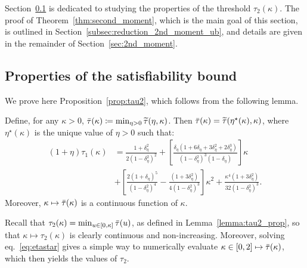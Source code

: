 Section~\ref{subsec:proof_properties_tau2} is dedicated to studying the properties of the threshold $\tau_2(\kappa)$. 
The proof of Theorem~\ref{thm:second_moment}, which is the main goal of this section, is outlined in Section~\ref{subsec:reduction_2nd_moment_ub},
and details are given in the remainder of Section~\ref{sec:2nd_moment}.

\subsection{Properties of the satisfiability bound}\label{subsec:proof_properties_tau2}

We prove here Proposition~\ref{prop:tau2}, which follows from the following lemma.
\begin{lemma}\label{lemma:tau2_prop}
    Define, for any $\kappa > 0$, ${\bar{\tau}}(\kappa) \coloneqq \min_{\eta > 0} {\widetilde{\tau}}(\eta, \kappa)$.
    Then ${\bar{\tau}}(\kappa) = {\widetilde{\tau}}(\eta^\star(\kappa),\kappa)$,
where
$\eta^\star(\kappa)$ is the unique value of $\eta > 0$ such that:
\begin{align}
    \label{eq:etastar}
      (1+\eta) \tau_1(\kappa) &=
\frac{1+\delta_\eta^2}{2(1-\delta_\eta^2)^2}
    + \left[\frac{\delta_\eta(1+6\delta_\eta+3\delta_\eta^2+2\delta_\eta^3)}{(1-\delta_\eta^2)^3(1-\delta_\eta)}\right] \kappa \\
    &
    + \left[ \frac{2(1+\delta_\eta)^5}{(1-\delta_\eta^2)^4} - \frac{(1+3 \delta_\eta^2)}{4(1-\delta_\eta^2)^3}\right] \kappa^2 
      + \frac{\kappa^4(1+3\delta_\eta^2)}{32(1-\delta_\eta^2)^3}.
\end{align}
Moreover, $\kappa \mapsto {\bar{\tau}}(\kappa)$ is a continuous function of $\kappa$.
\end{lemma}
\noindent
Recall that $\tau_2(\kappa) = \min_{u \in [0,\kappa]} {\bar{\tau}}(u)$, as defined in Lemma~\ref{lemma:tau2_prop}, 
so that $\kappa \mapsto \tau_2(\kappa)$ is clearly continuous and non-increasing.
Moreover, solving eq.~\eqref{eq:etastar} gives a simple way to numerically evaluate $\kappa \in [0,2] \mapsto {\bar{\tau}}(\kappa)$, which then yields the values of $\tau_2$.

